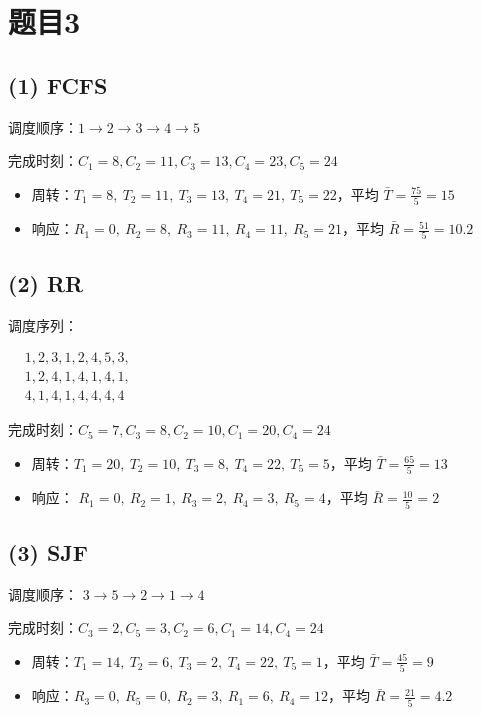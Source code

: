 \documentclass[fleqn]{ctexart}
\begin{document}
\section*{题目3}

\subsection*{(1) FCFS}
调度顺序：$1\to 2\to 3\to 4\to 5$

完成时刻：$C_1=8, C_2=11, C_3=13, C_4=23, C_5=24$

\begin{itemize}
	\item 周转：$T_1=8,\ T_2=11,\ T_3=13,\ T_4=21,\ T_5=22$，平均 $\bar T=\frac{75}{5}=15$
	\item 响应：$R_1=0,\ R_2=8,\ R_3=11,\ R_4=11,\ R_5=21$，平均 $\bar R=\frac{51}{5}=10.2$
\end{itemize}

\subsection*{(2) RR}
调度序列：

\medskip
$
\begin{aligned}
&1,2,3,1,2,4,5,3,\\
&1,2,4,1,4,1,4,1,\\
&4,1,4,1,4,4,4,4
\end{aligned}
$

\medskip
完成时刻：$C_5=7, C_3=8, C_2=10, C_1=20, C_4=24$

\begin{itemize}
	\item 周转：$T_1=20,\ T_2=10,\ T_3=8,\ T_4=22,\ T_5=5$，平均 $\bar T=\frac{65}{5}=13$
	\item 响应：
				$R_1=0,\ R_2=1,\ R_3=2,\ R_4=3,\ R_5=4$，平均 $\bar R=\frac{10}{5}=2$
\end{itemize}

\subsection*{(3) SJF}
调度顺序：
$3\to 5\to 2\to 1\to 4$

完成时刻：$C_3=2, C_5=3, C_2=6, C_1=14, C_4=24$

\begin{itemize}
	\item 周转：$T_1=14,\ T_2=6,\ T_3=2,\ T_4=22,\ T_5=1$，平均 $\bar T=\frac{45}{5}=9$
	\item 响应：$R_3=0,\ R_5=0,\ R_2=3,\ R_1=6,\ R_4=12$，平均 $\bar R=\frac{21}{5}=4.2$
\end{itemize}
\end{document}
